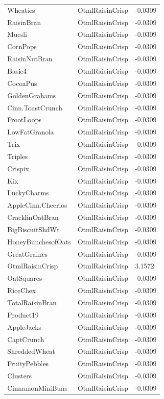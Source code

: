 \begin{table}[!htbp]
\begin{tabular}{lll}
Wheaties & OtmlRaisinCrisp & -0.0309
\\
RaisinBran & OtmlRaisinCrisp & -0.0309
\\
Muesli & OtmlRaisinCrisp & -0.0309
\\
CornPops & OtmlRaisinCrisp & -0.0309
\\
RaisinNutBran & OtmlRaisinCrisp & -0.0309
\\
Basic4 & OtmlRaisinCrisp & -0.0309
\\
CocoaPus & OtmlRaisinCrisp & -0.0309
\\
GoldenGrahams & OtmlRaisinCrisp & -0.0309
\\
Cinn.ToastCrunch & OtmlRaisinCrisp & -0.0309
\\
FrootLoops & OtmlRaisinCrisp & -0.0309
\\
LowFatGranola & OtmlRaisinCrisp & -0.0309
\\
Trix & OtmlRaisinCrisp & -0.0309
\\
Triples & OtmlRaisinCrisp & -0.0309
\\
Crispix & OtmlRaisinCrisp & -0.0309
\\
Kix & OtmlRaisinCrisp & -0.0309
\\
LuckyCharms & OtmlRaisinCrisp & -0.0309
\\
AppleCinn.Cheerios & OtmlRaisinCrisp & -0.0309
\\
CracklinOatBran & OtmlRaisinCrisp & -0.0309
\\
BigBiscuitShdWt & OtmlRaisinCrisp & -0.0309
\\
HoneyBunchesofOats & OtmlRaisinCrisp & -0.0309
\\
GreatGraines & OtmlRaisinCrisp & -0.0309
\\
OtmlRaisinCrisp & OtmlRaisinCrisp & 3.1572
\\
OatSquares & OtmlRaisinCrisp & -0.0309
\\
RiceChex & OtmlRaisinCrisp & -0.0309
\\
TotalRaisinBran & OtmlRaisinCrisp & -0.0309
\\
Product19 & OtmlRaisinCrisp & -0.0309
\\
AppleJacks & OtmlRaisinCrisp & -0.0309
\\
CaptCrunch & OtmlRaisinCrisp & -0.0309
\\
ShreddedWheat & OtmlRaisinCrisp & -0.0309
\\
FruityPebbles & OtmlRaisinCrisp & -0.0309
\\
Clusters & OtmlRaisinCrisp & -0.0309
\\
CinnamonMiniBuns & OtmlRaisinCrisp & -0.0309

\end{tabular}
\end{table}
